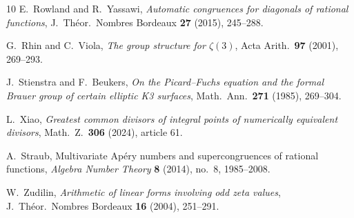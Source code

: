 \documentclass[11pt]{article}
\theoremstyle{definition}
\theoremstyle{remark}
\begin{document}
\begin{thebibliography}{10}
E.~Rowland and R.~Yassawi,
\emph{Automatic congruences for diagonals of rational functions},
J.~Th\'eor.\ Nombres Bordeaux \textbf{27} (2015), 245--288.

G.~Rhin and C.~Viola,
\emph{The group structure for $\zeta(3)$},
Acta Arith.\ \textbf{97} (2001), 269--293.

J.~Stienstra and F.~Beukers,
\emph{On the Picard--Fuchs equation and the formal Brauer
group of certain elliptic K3 surfaces},
Math.\ Ann.\ \textbf{271} (1985), 269--304.

L.~Xiao,
\emph{Greatest common divisors of integral points of
numerically equivalent divisors},
Math.\ Z.\ \textbf{306} (2024), article 61.

A.~Straub,
Multivariate Ap\'ery numbers and supercongruences of rational functions,
\textit{Algebra Number Theory} \textbf{8} (2014), no.~8, 1985--2008.

W.~Zudilin,
\emph{Arithmetic of linear forms involving odd zeta values},
J.~Th\'eor.\ Nombres Bordeaux \textbf{16} (2004), 251--291.
\end{thebibliography}








\end{document}
